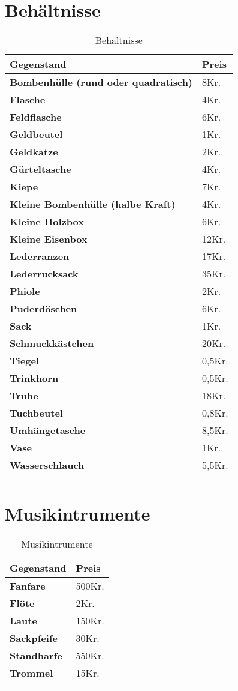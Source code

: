 \section{Behältnisse}
\begin{longtable}{|p{5cm}|p{2cm}|}
\hline
\textbf{Gegenstand} & \textbf{Preis} \\ \hline
\textbf{Bombenhülle (rund oder quadratisch)} & 8Kr. \\ \hline
\textbf{Flasche} & 4Kr. \\ \hline
\textbf{Feldflasche} & 6Kr. \\ \hline
\textbf{Geldbeutel} & 1Kr. \\ \hline
\textbf{Geldkatze} & 2Kr. \\ \hline
\textbf{Gürteltasche} & 4Kr. \\ \hline
\textbf{Kiepe} & 7Kr. \\ \hline
\textbf{Kleine Bombenhülle (halbe Kraft)} & 4Kr. \\ \hline
\textbf{Kleine Holzbox} & 6Kr. \\ \hline
\textbf{Kleine Eisenbox} & 12Kr. \\ \hline
\textbf{Lederranzen} & 17Kr. \\ \hline
\textbf{Lederrucksack} & 35Kr. \\ \hline
\textbf{Phiole} & 2Kr. \\ \hline
\textbf{Puderdöschen} & 6Kr. \\ \hline
\textbf{Sack} & 1Kr. \\ \hline
\textbf{Schmuckkästchen} & 20Kr. \\ \hline
\textbf{Tiegel} & 0,5Kr. \\ \hline
\textbf{Trinkhorn} & 0,5Kr. \\ \hline
\textbf{Truhe} & 18Kr. \\ \hline
\textbf{Tuchbeutel} & 0,8Kr. \\ \hline
\textbf{Umhängetasche} & 8,5Kr. \\ \hline
\textbf{Vase} & 1Kr. \\ \hline
\textbf{Wasserschlauch} & 5,5Kr. \\ \hline

\caption{Behältnisse}
\label{tab:Behältnisse}
\end{longtable}


\section{Musikintrumente}
\begin{longtable}{|p{5cm}|p{2cm}|}
\hline
\textbf{Gegenstand} & \textbf{Preis} \\ \hline
\textbf{Fanfare} & 500Kr. \\ \hline
\textbf{Flöte} & 2Kr. \\ \hline
\textbf{Laute} & 150Kr. \\ \hline
\textbf{Sackpfeife} & 30Kr. \\ \hline
\textbf{Standharfe} & 550Kr. \\ \hline
\textbf{Trommel} & 15Kr. \\ \hline

\caption{Musikintrumente}
\label{tab:Musikintrumente}
\end{longtable}



